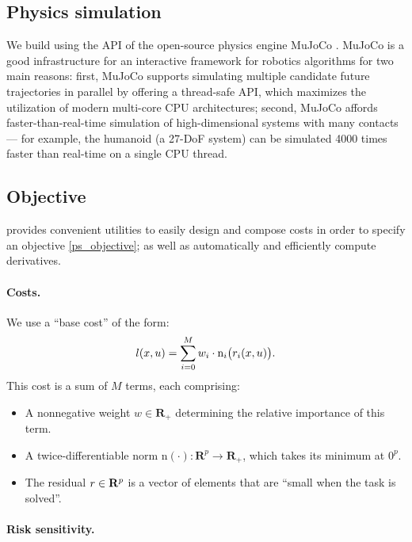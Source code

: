 \subsection{Physics simulation}
We build \app{} using the API of the open-source physics engine MuJoCo \cite{todorov2012mujoco}.  MuJoCo is a good infrastructure for an interactive framework for robotics algorithms for two main reasons: first, MuJoCo supports simulating multiple candidate future trajectories in parallel by offering a thread-safe API, which maximizes the utilization of modern multi-core CPU architectures; second, MuJoCo affords faster-than-real-time simulation of high-dimensional systems with many contacts --- for example, the humanoid (a 27-DoF system) can be simulated 4000 times faster than real-time on a single CPU thread.

\subsection{Objective}
\app{} provides convenient utilities to easily design and compose costs in order to specify an objective \eqref{ps_objective}; as well as automatically and efficiently compute derivatives.

\paragraph{Costs.}

We use a ``base cost'' of the form:
\begin{equation}
	\label{ps_riskfreecost}
	{l}({x}, {u}) = \sum_{i = 0}^M w_i \cdot \text{n}_i\big({r}_i({x}, {u})\big).
\end{equation}
This cost is a sum of $M$ terms, each comprising:
\begin{itemize}
	\item A nonnegative weight $w \in \mathbf{R}_{+}$ determining the relative importance of this term.
	\item A twice-differentiable norm $\text{n}(\cdot) : \mathbf{R}^p \rightarrow \mathbf{R}_+$, which takes its minimum at $0^p$.
	\item The residual ${r} \in \mathbf{R}^p$ is a vector of elements that are ``small when the task is solved''.%
\end{itemize}

\paragraph{Risk sensitivity.}

